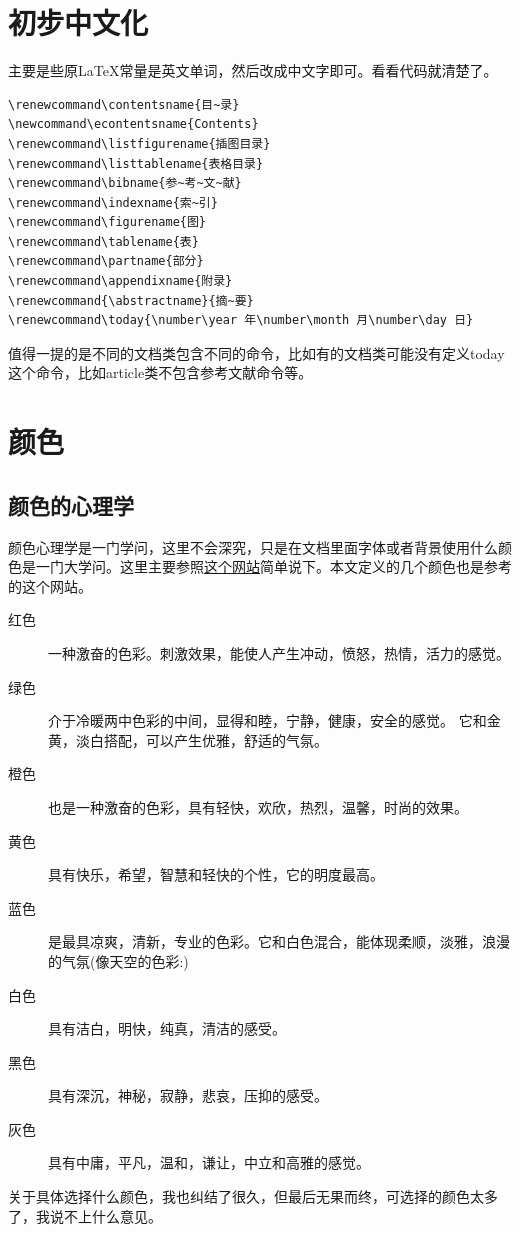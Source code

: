 \documentclass[11pt,oneside]{book}
\begin{document}
\chapter{初步中文化}
主要是些原\LaTeX 常量是英文单词，然后改成中文字即可。看看代码就清楚了。
\begin{Verbatim}
\renewcommand\contentsname{目~录}
\newcommand\econtentsname{Contents}
\renewcommand\listfigurename{插图目录}
\renewcommand\listtablename{表格目录}
\renewcommand\bibname{参~考~文~献}
\renewcommand\indexname{索~引}
\renewcommand\figurename{图}
\renewcommand\tablename{表}
\renewcommand\partname{部分}
\renewcommand\appendixname{附录}
\renewcommand{\abstractname}{摘~要}
\renewcommand\today{\number\year 年\number\month 月\number\day 日}
\end{Verbatim}

值得一提的是不同的文档类包含不同的命令，比如有的文档类可能没有定义today这个命令，比如article类不包含参考文献命令等。



\chapter{颜色}
\label{sec:颜色}
\section{颜色的心理学}
颜色心理学是一门学问，这里不会深究，只是在文档里面字体或者背景使用什么颜色是一门大学问。这里主要参照\href{http://www.jb51.net/article/8216.htm}{这个网站}简单说下。本文定义的几个颜色也是参考的这个网站。

\begin{description}
\item[红色] 一种激奋的色彩。刺激效果，能使人产生冲动，愤怒，热情，活力的感觉。
\item[绿色] 介于冷暖两中色彩的中间，显得和睦，宁静，健康，安全的感觉。 它和金黄，淡白搭配，可以产生优雅，舒适的气氛。
\item[橙色] 也是一种激奋的色彩，具有轻快，欢欣，热烈，温馨，时尚的效果。
\item[黄色] 具有快乐，希望，智慧和轻快的个性，它的明度最高。 
\item[蓝色] 是最具凉爽，清新，专业的色彩。它和白色混合，能体现柔顺，淡雅，浪漫的气氛(像天空的色彩:) 
\item[白色] 具有洁白，明快，纯真，清洁的感受。 
\item[黑色] 具有深沉，神秘，寂静，悲哀，压抑的感受。 
\item[灰色] 具有中庸，平凡，温和，谦让，中立和高雅的感觉。 　　
\end{description}
关于具体选择什么颜色，我也纠结了很久，但最后无果而终，可选择的颜色太多了，我说不上什么意见。
\end{document}
